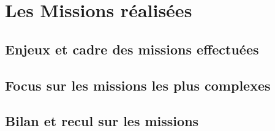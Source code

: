 \chapter{Les Missions réalisées}
\section{Enjeux et cadre des missions effectuées}
\section{Focus sur les missions les plus complexes}
\section{Bilan et recul sur les missions}
